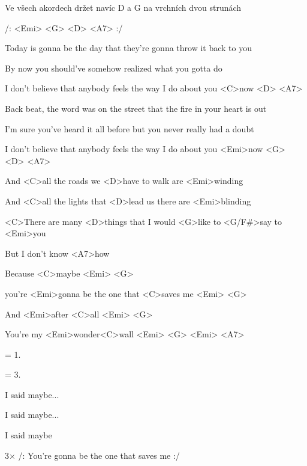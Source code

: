 

Ve všech akordech držet navíc D a G na vrchních dvou strunách

/: <Emi> <G> <D> <A7> :/

\zs
Today is gonna be the day
that they're gonna throw it back to you

By now you should've somehow
realized what you gotta do

I don't believe that anybody feels the way I do
about you <C>now <D> <A7>
\ks

\zs
Back beat, the word was on the street
that the fire in your heart is out

I'm sure you've heard it all before
but you never really had a doubt

I don't believe that anybody feels the way I do
about you <Emi>now <G> <D> <A7>
\ks

\zs
And <C>all the roads we <D>have to walk are <Emi>winding

And <C>all the lights that <D>lead us there are <Emi>blinding

<C>There are many <D>things that I would <G>like to <G/F#>say to <Emi>you

But I don't know <A7>how
\ks

\zr
Because <C>maybe <Emi> <G>

you're <Emi>gonna be the one that <C>saves me <Emi> <G>

And <Emi>after <C>all <Emi> <G>

You're my <Emi>wonder<C>wall <Emi> <G> <Emi> <A7>
\kr

\zs
= 1.
\ks

\zs
= 3.
\ks

\zr I said maybe... \kr

\zr I said maybe... \kr

\zr
I said maybe

3× /: You're gonna be the one that saves me :/
\kr

\kp
